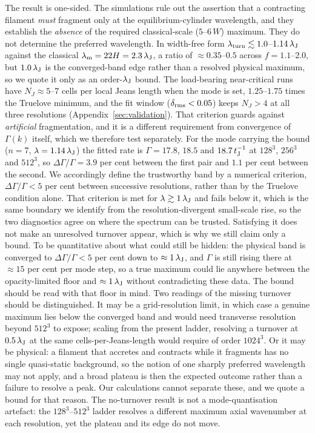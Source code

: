 \documentclass[usenatbib,twoside,twocolumn]{mnras}
\begin{document}
The result is one-sided. The simulations rule out the assertion that a contracting filament \emph{must} fragment only at the equilibrium-cylinder wavelength, and they establish the \emph{absence} of the required classical-scale ($5$--$6\,W$) maximum. They do not determine the preferred wavelength. In width-free form $\lambda_{\rm turn}\lesssim1.0$--$1.14\,\lambda_{\rm J}$ against the classical $\lambda_{\rm m}=22H=2.3\,\lambda_{\rm J}$, a ratio of $\approx0.35$--$0.5$ across $f=1.1$--$2.0$, but $1.0\,\lambda_{\rm J}$ is the converged-band edge rather than a resolved physical maximum, so we quote it only as an order-$\lambda_{\rm J}$ bound. The load-bearing near-critical runs have $N_J\approx5$--$7$ cells per local Jeans length when the mode is set, $1.25$--$1.75$ times the Truelove minimum, and the fit window ($\delta_{\rm rms}<0.05$) keeps $N_J>4$ at all three resolutions (Appendix~\ref{sec:validation}). That criterion guards against \emph{artificial} fragmentation, and it is a different requirement from convergence of $\Gamma(k)$ itself, which we therefore test separately. For the mode carrying the bound ($n=7$, $\lambda=1.14\,\lambda_{\rm J}$) the fitted rate is $\Gamma=17.8$, $18.5$ and $18.7\,t_{\rm J}^{-1}$ at $128^3$, $256^3$ and $512^3$, so $\Delta\Gamma/\Gamma=3.9$ per cent between the first pair and $1.1$ per cent between the second. We accordingly define the trustworthy band by a numerical criterion, $\Delta\Gamma/\Gamma<5$ per cent between successive resolutions, rather than by the Truelove condition alone. That criterion is met for $\lambda\gtrsim1\,\lambda_{\rm J}$ and fails below it, which is the same boundary we identify from the resolution-divergent small-scale rise, so the two diagnostics agree on where the spectrum can be trusted. Satisfying it does not make an unresolved turnover appear, which is why we still claim only a bound. To be quantitative about what could still be hidden: the physical band is converged to $\Delta\Gamma/\Gamma<5$ per cent down to $\approx1\,\lambda_{\rm J}$, and $\Gamma$ is still rising there at $\approx15$ per cent per mode step, so a true maximum could lie anywhere between the opacity-limited floor and $\approx1\,\lambda_{\rm J}$ without contradicting these data. The bound should be read with that floor in mind. Two readings of the missing turnover should be distinguished. It may be a grid-resolution limit, in which case a genuine maximum lies below the converged band and would need transverse resolution beyond $512^3$ to expose; scaling from the present ladder, resolving a turnover at $0.5\,\lambda_{\rm J}$ at the same cells-per-Jeans-length would require of order $1024^3$. Or it may be physical: a filament that accretes and contracts while it fragments has no single quasi-static background, so the notion of one sharply preferred wavelength may not apply, and a broad plateau is then the expected outcome rather than a failure to resolve a peak. Our calculations cannot separate these, and we quote a bound for that reason. The no-turnover result is not a mode-quantisation artefact: the $128^3$--$512^3$ ladder resolves a different maximum axial wavenumber at each resolution, yet the plateau and its edge do not move.
\end{document}
